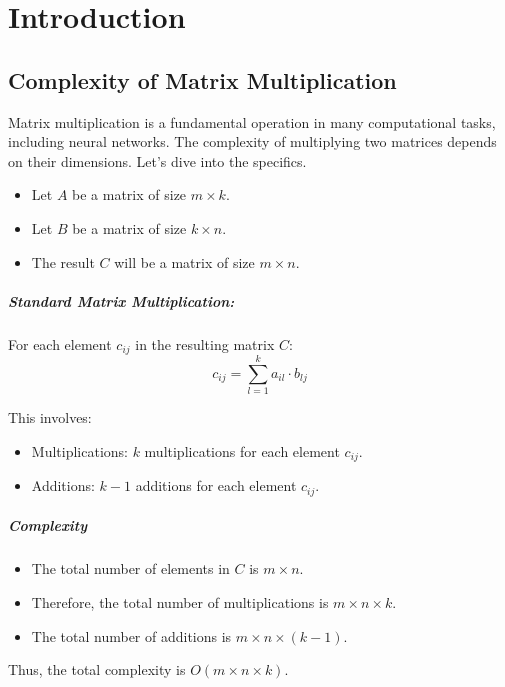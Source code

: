 \chapter{Introduction}

\section{Complexity of Matrix Multiplication}

Matrix multiplication is a fundamental operation in many computational tasks, including neural networks. The complexity of multiplying two matrices depends on their dimensions. Let's dive into the specifics.

\begin{itemize}
	\item Let \(A\) be a matrix of size \(m \times k\).
	\item Let \(B\) be a matrix of size \(k \times n\).
	\item The result \(C\) will be a matrix of size \(m \times n\).
\end{itemize}

\paragraph{Standard Matrix Multiplication:} For each element \(c_{ij}\) in the resulting matrix \(C\):
\[ c_{ij} = \sum_{l=1}^{k} a_{il} \cdot b_{lj} \]

This involves:
\begin{itemize}
	\item Multiplications: \(k\) multiplications for each element \(c_{ij}\).
	\item Additions: \(k-1\) additions for each element \(c_{ij}\).
\end{itemize}

\paragraph{Complexity}
\begin{itemize}
	\item The total number of elements in \(C\) is \(m \times n\).
	\item Therefore, the total number of multiplications is \(m \times n \times k\).
	\item The total number of additions is \(m \times n \times (k-1)\).
\end{itemize}

Thus, the total complexity is \(O(m \times n \times k)\).

